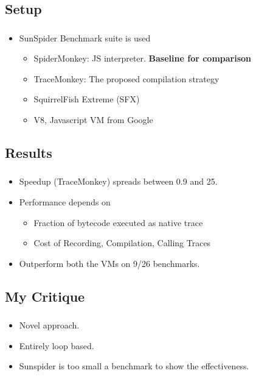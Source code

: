 \documentclass[mathserif,10pt]{beamer}
\newcommand{\cmt}[1]{}
\begin{document}
\subsection{Setup}
\frame
{
  \frametitle{\subsecname}
  \begin{itemize}
    \item SunSpider Benchmark suite is used
    \begin{itemize}
        \item SpiderMonkey: JS interpreter. \textbf{Baseline for comparison}
        \item TraceMonkey: The proposed compilation strategy
        \item SquirrelFish Extreme (SFX)
                                          \cmt{
        : Call threaded JS interpreter
                                          }
        \item V8, Javascript VM from Google
          \cmt{
            : Method compiling JS VM
          }
    \end{itemize}
  \end{itemize}
}
\subsection{Results}
\frame
{
  \frametitle{\subsecname}
  \begin{itemize}
    \item Speedup (TraceMonkey) spreads between 0.9 and 25. 
    \item Performance depends on
    \begin{itemize}
      \item Fraction of bytecode executed as native trace
      \item Cost of Recording, Compilation, Calling Traces
      \cmt{good perf when where VM spends majority of time running native code}
    \end{itemize}
    \item Outperform both the VMs on 9/26 benchmarks.
  \end{itemize}
}

\subsection{My Critique}
\frame
{
  \frametitle{\subsecname}
  \begin{itemize}
    \item Novel approach. 
    \item Entirely loop based. 
    \item Sunspider is too small a benchmark to show the effectiveness.
    \cmt{
      This method will works if there exist long trip count loops in the program, which is not
usual in real web pages ... it is mostly method driven... but these will be help ful in
online gaming or google maps which do have long loops
    }
  \end{itemize}
}
\end{document}
